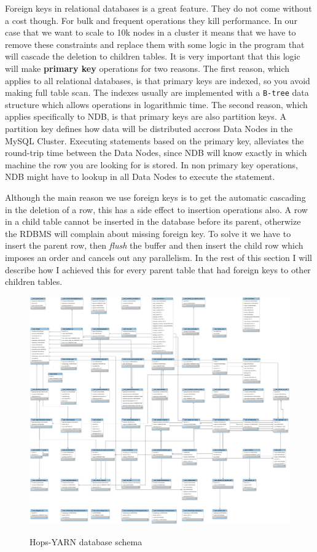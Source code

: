 Foreign keys in relational databases is a great feature. They do not
come without a cost though. For bulk and frequent operations they kill
performance. In our case that we want to scale to 10k nodes in a
cluster it means that we have to remove these constraints and replace
them with some logic in the program that will cascade the deletion to
children tables. It is very important that this logic will make
\textbf{primary key} operations for two reasons. The first reason, which
applies to all relational databases, is that primary keys are indexed,
so you avoid making full table scan. The indexes usually are
implemented with a \texttt{B-tree} data structure which allows
operations in logarithmic time. The second reason, which applies
specifically to NDB, is that primary keys are also partition keys. A
partition key defines how data will be distributed accross Data Nodes
in the MySQL Cluster. Executing statements based on the primary key,
alleviates the round-trip time between the Data Nodes, since NDB will
know exactly in which machine the row you are looking for is
stored. In non primary key operations, NDB might have to lookup in all
Data Nodes to execute the statement.

Although the main reason we use foreign keys is to get the
automatic cascading in the deletion of a row, this has a side effect to
insertion operations also. A row in a child table cannot be inserted
in the database before its parent, otherwize the RDBMS will complain
about missing foreign key. To solve it we have to insert the parent
row, then \emph{flush} the buffer and then insert the child row which
imposes an order and cancels out any parallelism. In the rest of this section I will describe how I achieved
this for every parent table that had foreign keys to other children tables.

\begin{figure}
\centering
\includegraphics[scale=0.2, angle=90]{resources/images/Implementation/hops_yarn_ndb_schema_full.png}
\label{fig:impl_fk_yarn_schema}
\caption{Hops-YARN database schema}
\end{figure}

